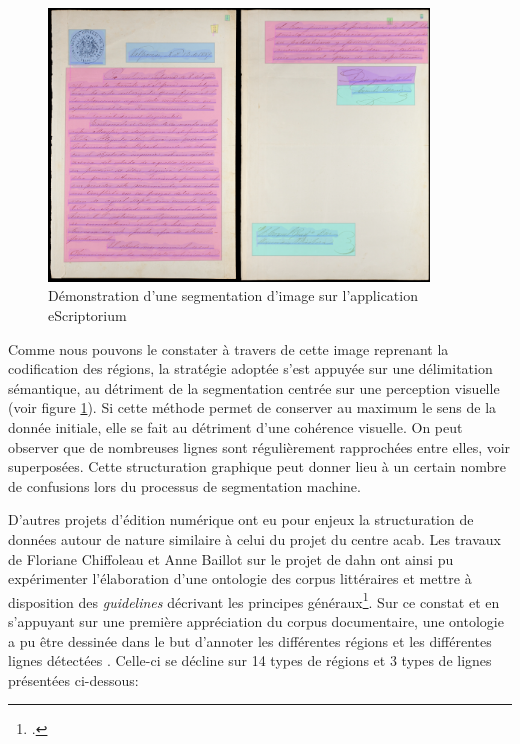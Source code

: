 	\begin{figure}[h!]
	    \centering
	    \includegraphics[width = 0.90\textwidth]{annexes/img/segmentation_img.png}
	    \caption{Démonstration d'une segmentation d'image sur l'application \gls{eScriptorium}}
	    \label{fig:segmentation}
	\end{figure}
	
	Comme nous pouvons le constater à travers de cette image reprenant la codification des régions, la stratégie adoptée s'est appuyée sur une délimitation sémantique, au détriment de la segmentation centrée sur une perception visuelle (voir figure \ref{fig:segmentation}). Si cette méthode permet de conserver au maximum le sens de la donnée initiale, elle se fait au détriment d'une cohérence visuelle. On peut observer que de nombreuses lignes sont régulièrement rapprochées entre elles, voir superposées. Cette structuration graphique peut donner lieu à un certain nombre de confusions lors du processus de segmentation machine.
	
	D'autres projets d'édition numérique ont eu pour enjeux la structuration de données autour de nature similaire à celui du projet du centre \gls{acab}. Les travaux de Floriane Chiffoleau et Anne Baillot sur le projet de \gls{dahn} ont ainsi pu expérimenter l'élaboration d'une ontologie des corpus littéraires et mettre à disposition des \textit{guidelines} décrivant les principes généraux\footcite{chiffoleauDAHNProjectDigital2022}. Sur ce constat et en s'appuyant sur une première appréciation du corpus documentaire, une ontologie a pu être dessinée dans le but d'annoter les différentes régions et les différentes lignes détectées . Celle-ci se décline sur 14 types de régions et 3 types de lignes présentées ci-dessous: \\
	

